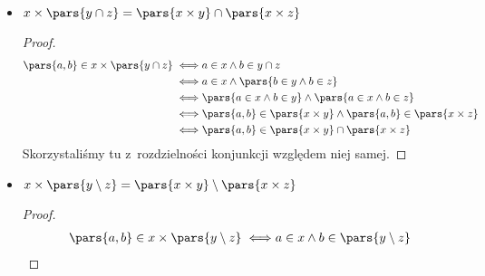 \begin{itemize}
\begin{proof}
\begin{equation*}
\begin{split}
				      \iff & \pars{\exists_{a \in x}\exists_{b \in y}\xi = \pars{a, b}} \lor \pars{\exists_{a \in x}\exists_{b \in z}\xi = \pars{a, b}}                           \\
				      \iff & \xi \in \pars{x \times y} \lor \xi \in \pars{x \times z}                                                                                             \\
				      \iff & \xi \in \pars{x \times y} \cup \pars{x \times z}
			      \end{split}
		      \end{equation*}
		      Skorzystaliśmy tutaj z~rozdzielności konjunkcji względem alternatywy oraz z~faktu, że
		      \begin{equation*}
			      \exists_v\pars{\varphi \lor \psi} \iff \pars{\exists_v\varphi} \lor \pars{\exists_v\psi}
		      \end{equation*}
	      \end{proof}
	\item \(x \times \pars{y \cap z} = \pars{x \times y} \cap \pars{x \times z}\)
	      \begin{proof}
		      \begin{equation*}
			      \begin{split}
				      \pars{a, b} \in x \times \pars{y \cap z}
				      \iff & a \in x \land b \in y \cap z                                              \\
				      \iff & a \in x \land \pars{b \in y \land b \in z}                                \\
				      \iff & \pars{a \in x \land b \in y} \land \pars{a \in x \land b \in z}           \\
				      \iff & \pars{a, b} \in \pars{x \times y} \land \pars{a, b} \in \pars{x \times z} \\
				      \iff & \pars{a, b} \in \pars{x \times y} \cap \pars{x \times z}
			      \end{split}
		      \end{equation*}
		      Skorzystaliśmy tu z~rozdzielności konjunkcji względem niej samej.
	      \end{proof}
	\item \(x \times \pars{y \setminus z} = \pars{x \times y} \setminus \pars{x \times z}\)
	      \begin{proof}
		      \begin{equation*}
			      \begin{split}
				      \pars{a, b} \in x \times \pars{y \setminus z}
				      \iff & a \in x \land b \in \pars{y \setminus z}                                      \\

\end{split}
\end{equation*}
\end{proof}
\end{itemize}

